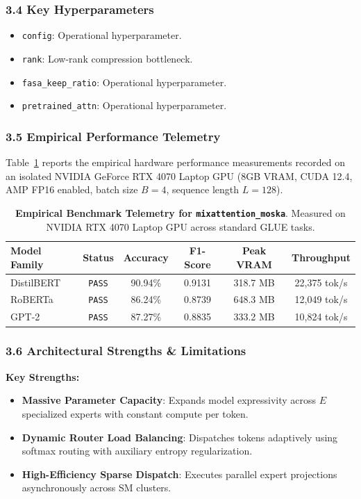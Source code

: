 \subsubsection*{3.4 Key Hyperparameters}
\begin{itemize}
    \item \texttt{config}: Operational hyperparameter.
    \item \texttt{rank}: Low-rank compression bottleneck.
    \item \texttt{fasa\_keep\_ratio}: Operational hyperparameter.
    \item \texttt{pretrained\_attn}: Operational hyperparameter.
\end{itemize}

\subsubsection*{3.5 Empirical Performance Telemetry}
Table~\ref{tab:telemetry_mixattention_moska} reports the empirical hardware performance measurements recorded on an isolated NVIDIA GeForce RTX 4070 Laptop GPU (8GB VRAM, CUDA 12.4, AMP FP16 enabled, batch size $B=4$, sequence length $L=128$).

\begin{table}[h]
\centering
\small
\caption{\textbf{Empirical Benchmark Telemetry for \texttt{mixattention\_moska}}. Measured on NVIDIA RTX 4070 Laptop GPU across standard GLUE tasks.}
\label{tab:telemetry_mixattention_moska}
\begin{tabular*}{\columnwidth}{@{\extracolsep{\fill}}lccccc}
\toprule
\textbf{Model Family} & \textbf{Status} & \textbf{Accuracy} & \textbf{F1-Score} & \textbf{Peak VRAM} & \textbf{Throughput} \\
\midrule
DistilBERT & \texttt{PASS} & 90.94\% & 0.9131 & 318.7 MB & 22,375 tok/s \\
RoBERTa & \texttt{PASS} & 86.24\% & 0.8739 & 648.3 MB & 12,049 tok/s \\
GPT-2 & \texttt{PASS} & 87.27\% & 0.8835 & 333.2 MB & 10,824 tok/s \\
\bottomrule
\end{tabular*}
\end{table}

\subsubsection*{3.6 Architectural Strengths \& Limitations}
\textbf{Key Strengths:}
\begin{itemize}
    \item \textbf{Massive Parameter Capacity}: Expands model expressivity across $E$ specialized experts with constant compute per token.
    \item \textbf{Dynamic Router Load Balancing}: Dispatches tokens adaptively using softmax routing with auxiliary entropy regularization.
    \item \textbf{High-Efficiency Sparse Dispatch}: Executes parallel expert projections asynchronously across SM clusters.
\end{itemize}

